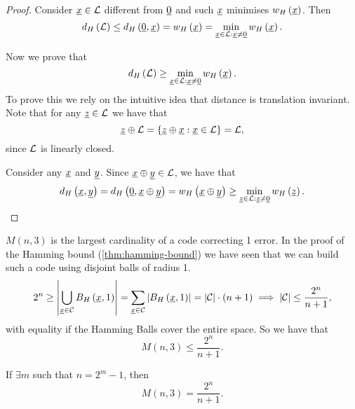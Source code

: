 \begin{proof}
	Consider $\underline{x} \in \mathcal{L}$ different from $\underline{0}$ and such $\underline{x}$ minimises $w_H\left(\underline{x}\right)$.
	Then
	\begin{equation*}
		d_H \left({\mathcal{L}}\right) \le d_H \left({\underline{0}, \underline{x}}\right) = w_H\left(\underline{x}\right) = \min_{\underline{x} \in \mathcal{L} : \underline{x} \neq \underline{0}} w_H\left(\underline{x}\right).
	\end{equation*}

	Now we prove that
	\begin{equation*}
		d_H \left({\mathcal{L}}\right) \ge \min_{\underline{x} \in \mathcal{L} : \underline{x} \neq \underline{0}} w_H\left(\underline{x}\right).
	\end{equation*}
	To prove this we rely on the intuitive idea that distance is translation invariant.
	Note that for any $\underline{z} \in \mathcal{L}$ we have that
	\begin{equation*}
		\underline{z} \oplus \mathcal{L}
		=
		\left\{ \underline{z} \oplus \underline{x} : \underline{x} \in \mathcal{L} \right\}
		=
		\mathcal{L},
	\end{equation*}
	since $\mathcal{L}$ is linearly closed.

	Consider any $\underline{x}$ and $\underline{y}$.
	Since $\underline{x} \oplus \underline{y} \in \mathcal{L}$, we have that
	\begin{equation*}
		d_H \left({\underline{x}, \underline{y}}\right)
		=
		d_H \left({\underline{0}, \underline{x} \oplus \underline{y}}\right)
		=
		w_H\left(\underline{x} \oplus \underline{y}\right)
		\ge
		\min_{\underline{z} \in \mathcal{L} : \underline{z} \neq \underline{0}} w_H\left(\underline{z}\right). \qedhere
	\end{equation*}
\end{proof}

$M(n, 3)$ is the largest cardinality of a code correcting 1 error.
In the proof of the Hamming bound (\cref{thm:hamming-bound}) we have seen that we can build such a code using disjoint balls of radius 1.
\begin{equation*}
	2^n
	\ge
	\left|{\bigcup_{\underline{x} \in \mathcal{C}} B_H\left(\underline{x}, 1\right)}\right|
	=
	\sum_{\underline{x} \in \mathcal{C}} \left|{B_H\left(\underline{x}, 1\right)}\right|
	=
	\left|{\mathcal{C}}\right| \cdot (n + 1)
	\implies
	\left|{\mathcal{C}}\right| \le \frac{2^n}{n+1},
\end{equation*}
with equality if the Hamming Balls cover the entire space.
So we have that
\begin{equation*}
	M(n, 3) \le \frac{2^n}{n+1}.
\end{equation*}

\begin{thm}
	If $\exists m$ such that $n = 2^m - 1$, then
	\begin{equation*}
		M(n, 3) = \frac{2^n}{n+1}.
	\end{equation*}
\end{thm}

